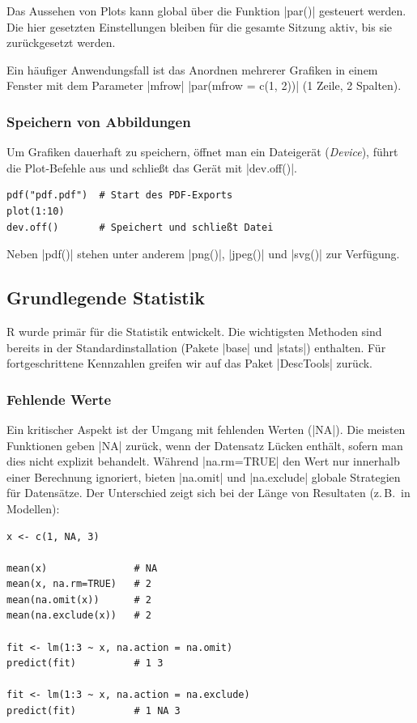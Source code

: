 \documentclass[10pt,twocolumn]{scrartcl}
\renewcommand{\lstinline}{\mycoloredinline}
\begin{document}
Das Aussehen von Plots kann global über die Funktion \lstinline|par()| gesteuert werden. Die hier gesetzten Einstellungen bleiben für die gesamte Sitzung aktiv, bis sie zurückgesetzt werden.

Ein häufiger Anwendungsfall ist das Anordnen mehrerer Grafiken in einem Fenster mit dem Parameter \lstinline|mfrow| \lstinline|par(mfrow = c(1, 2))| (1 Zeile, 2 Spalten).

\subsubsection{Speichern von Abbildungen}

Um Grafiken dauerhaft zu speichern, öffnet man ein Dateigerät (\emph{Device}), führt die Plot-Befehle aus und schließt das Gerät mit \lstinline|dev.off()|.

\begin{lstlisting}
pdf("pdf.pdf")  # Start des PDF-Exports
plot(1:10)
dev.off()       # Speichert und schließt Datei
\end{lstlisting}

Neben \lstinline|pdf()| stehen unter anderem \lstinline|png()|, \lstinline|jpeg()| und \lstinline|svg()| zur Verfügung.


\subsection{Grundlegende Statistik}

R wurde primär für die Statistik entwickelt. Die wichtigsten Methoden sind bereits in der Standardinstallation (Pakete \lstinline|base| und \lstinline|stats|) enthalten. Für fortgeschrittene Kennzahlen greifen wir auf das Paket \lstinline|DescTools| zurück.


\subsubsection{Fehlende Werte}

Ein kritischer Aspekt ist der Umgang mit fehlenden Werten (\lstinline|NA|). Die meisten Funktionen geben \lstinline|NA| zurück, wenn der Datensatz Lücken enthält, sofern man dies nicht explizit behandelt. Während \lstinline|na.rm=TRUE| den Wert nur innerhalb einer Berechnung ignoriert, bieten \lstinline|na.omit| und \lstinline|na.exclude| globale Strategien für Datensätze. Der Unterschied zeigt sich bei der Länge von Resultaten (z.\,B.\ in Modellen):

\begin{lstlisting}
x <- c(1, NA, 3)

mean(x)               # NA
mean(x, na.rm=TRUE)   # 2
mean(na.omit(x))      # 2
mean(na.exclude(x))   # 2

fit <- lm(1:3 ~ x, na.action = na.omit)
predict(fit)          # 1 3

fit <- lm(1:3 ~ x, na.action = na.exclude)
predict(fit)          # 1 NA 3
\end{lstlisting}
\end{document}
